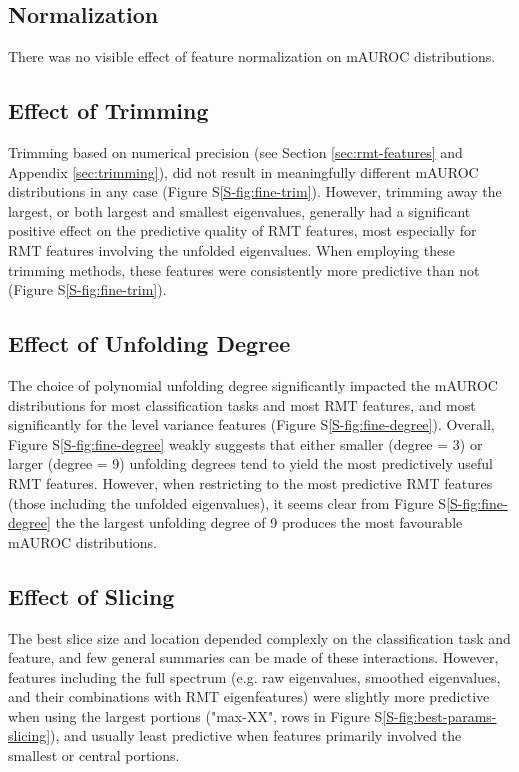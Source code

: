 \documentclass[12pt]{spieman}  %
\begin{document}
\begin{spacing}{2}
\subsection{Normalization}
There was no visible effect of feature normalization on mAUROC distributions.


\subsection{Effect of Trimming}
Trimming based on numerical precision (see Section \ref{sec:rmt-features} and
Appendix \ref{sec:trimming}), did not result in meaningfully different mAUROC
distributions in any case (Figure S\ref{S-fig:fine-trim}). However, trimming
away the largest, or both largest and smallest eigenvalues, generally had a
significant positive effect on the predictive quality of RMT features, most
especially for RMT features involving the unfolded eigenvalues. When employing
these trimming methods, these features were consistently more predictive than
not (Figure S\ref{S-fig:fine-trim}).

\subsection{Effect of Unfolding Degree}
The choice of polynomial unfolding degree significantly impacted the mAUROC
distributions for most classification tasks and most RMT features, and most
significantly for the level variance features (Figure
S\ref{S-fig:fine-degree}). Overall, Figure S\ref{S-fig:fine-degree} weakly
suggests that either smaller (degree = 3) or larger (degree = 9) unfolding
degrees tend to yield the most predictively useful RMT features. However, when
restricting to the most predictive RMT features (those including the unfolded
eigenvalues), it seems clear from Figure S\ref{S-fig:fine-degree} the the
largest unfolding degree of 9 produces the most favourable mAUROC
distributions.

\subsection{Effect of Slicing}
The best slice size and location depended complexly on the classification task
and feature, and few general summaries can be made of these interactions.
However, features including the full spectrum (e.g. raw eigenvalues, smoothed
eigenvalues, and their combinations with RMT eigenfeatures) were slightly more
predictive when using the largest portions ("max-XX", rows in Figure
S\ref{S-fig:best-params-slicing}), and usually least predictive when features
primarily involved the smallest or central portions.



\end{spacing}
\end{document}
